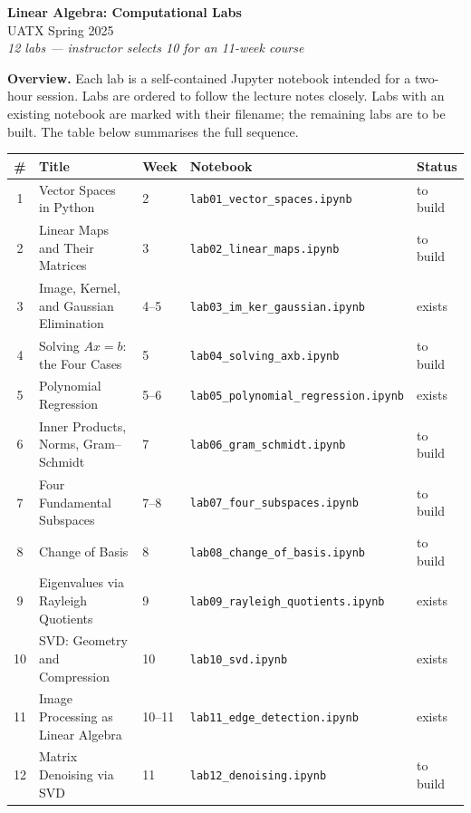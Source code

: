 \documentclass[11pt, a4paper]{article}
\begin{document}
\begin{center}
  {\LARGE\bfseries Linear Algebra: Computational Labs}\\[6pt]
  {\large UATX \quad Spring 2025}\\[4pt]
  \textit{12 labs — instructor selects 10 for an 11-week course}
\end{center}

\vspace{8pt}

\noindent\textbf{Overview.}
Each lab is a self-contained Jupyter notebook intended for a two-hour session.
Labs are ordered to follow the lecture notes closely. Labs with an existing
notebook are marked with their filename; the remaining labs are to be built.
The table below summarises the full sequence.

\vspace{8pt}

\begin{center}
\begin{tabular}{cllll}
\toprule
\# & Title & Week & Notebook & Status \\
\midrule
1  & Vector Spaces in Python              & 2  & \texttt{lab01\_vector\_spaces.ipynb}          & to build \\
2  & Linear Maps and Their Matrices       & 3  & \texttt{lab02\_linear\_maps.ipynb}            & to build \\
3  & Image, Kernel, and Gaussian Elimination & 4--5 & \texttt{lab03\_im\_ker\_gaussian.ipynb}   & exists   \\
4  & Solving $Ax=b$: the Four Cases       & 5  & \texttt{lab04\_solving\_axb.ipynb}           & to build \\
5  & Polynomial Regression                & 5--6 & \texttt{lab05\_polynomial\_regression.ipynb} & exists   \\
6  & Inner Products, Norms, Gram--Schmidt & 7  & \texttt{lab06\_gram\_schmidt.ipynb}           & to build \\
7  & Four Fundamental Subspaces           & 7--8 & \texttt{lab07\_four\_subspaces.ipynb}        & to build \\
8  & Change of Basis                      & 8  & \texttt{lab08\_change\_of\_basis.ipynb}       & to build \\
9  & Eigenvalues via Rayleigh Quotients   & 9  & \texttt{lab09\_rayleigh\_quotients.ipynb}    & exists   \\
10 & SVD: Geometry and Compression        & 10 & \texttt{lab10\_svd.ipynb}                    & exists   \\
11 & Image Processing as Linear Algebra   & 10--11 & \texttt{lab11\_edge\_detection.ipynb}    & exists   \\
12 & Matrix Denoising via SVD             & 11 & \texttt{lab12\_denoising.ipynb}               & to build \\
\bottomrule
\end{tabular}
\end{center}
\end{document}
